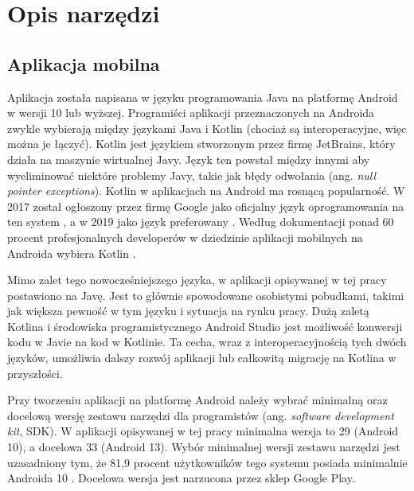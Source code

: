 \documentclass[a4paper,twoside,12pt]{book}
\newcommand{\obcy}[1]{\emph{#1}}
\newcommand{\english}[1]{{\selectlanguage{british}\obcy{#1}}}
\begin{document}
\section{Opis narzędzi}

%
\subsection{Aplikacja mobilna}
Aplikacja została napisana w języku programowania Java na platformę Android w wersji 10 lub wyższej. Programiści aplikacji przeznaczonych na Androida zwykle wybierają między językami Java i Kotlin (chociaż są interoperacyjne, więc można je łączyć). Kotlin jest językiem stworzonym przez firmę JetBrains, który działa na maszynie wirtualnej Javy. Język ten powstał między innymi aby wyeliminować niektóre problemy Javy, takie jak błędy odwołania (ang. \english{null pointer exceptions}). Kotlin w aplikacjach na Android ma rosnącą popularność. W 2017 został ogłoszony przez firmę Google jako oficjalny język oprogramowania na ten system \cite{bib:internetKotlin17}, a w 2019 jako język preferowany \cite{bib:internetKotlin19}. Według dokumentacji ponad 60 procent profesjonalnych developerów w dziedzinie aplikacji mobilnych na Androida wybiera Kotlin \cite{bib:internetKotlin19}.

Mimo zalet tego nowocześniejszego języka, w aplikacji opisywanej w tej pracy postawiono na Javę. Jest to głównie spowodowane osobistymi pobudkami, takimi jak większa pewność w tym języku i sytuacja na rynku pracy. Dużą zaletą Kotlina i środowiska programistycznego Android Studio jest możliwość konwersji kodu w Javie na kod w Kotlinie. Ta cecha, wraz z interoperacyjnością tych dwóch języków, umożliwia dalszy rozwój aplikacji lub całkowitą migrację na Kotlina w przyszłości. 

Przy tworzeniu aplikacji na platformę Android należy wybrać minimalną oraz docelową wersję zestawu narzędzi dla programistów (ang. \english{software development kit}, SDK). W aplikacji opisywanej w tej pracy minimalna wersja to 29 (Android 10), a docelowa 33 (Android 13). Wybór minimalnej wersji zestawu narzędzi jest uzasadniony tym, że 81,9 procent użytkowników tego systemu posiada minimalnie Androida 10 \cite{bib:internetapilevels}. Docelowa wersja jest narzucona przez sklep Google Play. 
\end{document}
